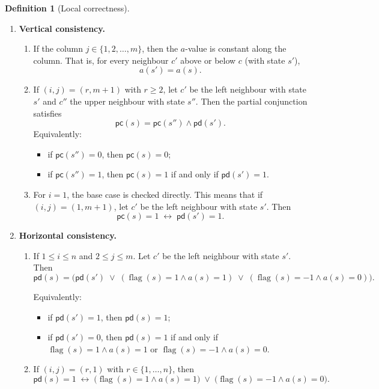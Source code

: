\documentclass{article}
\theoremstyle{plain}
\theoremstyle{definition}
\newtheorem{definition}[theorem]{Definition}
\DeclareMathOperator{\flag}{flag}
\newcommand{\pc}{\mathsf{pc}}
\newcommand{\pd}{\mathsf{pd}}
\begin{document}
\begin{definition}[Local correctness]
\begin{enumerate}[label=(\Alph*)]
\item \textbf{Vertical consistency.}
\begin{enumerate}[label=(C\arabic*)]
 \item If the column $j \in \{1,2,\dots,m\}$, then the $a$-value is constant along
the column. That is, for every neighbour $c'$ above or below $c$
(with state $s'$),
\[
a(s') = a(s).
\]
\item If $(i,j)=(r,m+1)$ with $r\ge 2$, let $c'$ be the left neighbour
with state $s'$ and $c''$ the upper neighbour with state $s''$.
Then the partial conjunction satisfies
\[
\pc(s)
=
\pc(s'') \wedge \pd(s').
\]
Equivalently:
\begin{itemize}
    \item if $\pc(s'')=0$, then $\pc(s)=0$;
    \item if $\pc(s'')=1$, then $\pc(s)=1$ if and only if $\pd(s')=1$.
\end{itemize}

  \item For $i=1$, the base case is checked directly. This means that if $(i,j)=(1,m+1)$, let $c'$ be the left neighbour with state
$s'$. Then
\[
\pc(s)=1 \;\leftrightarrow\; \pd(s')=1.
\]
\end{enumerate}
\item \textbf{Horizontal consistency.}
\begin{enumerate}[label=(D\arabic*)]
  \item If $1 \leq i \leq n$ and $2 \leq j \leq m$. Let $c'$ be the
left neighbour with state $s'$. Then
\[
\pd(s)
=
\bigl(\pd(s')
\;\vee\;
(\flag(s)=1 \wedge a(s)=1)
\;\vee\;
(\flag(s)=-1 \wedge a(s)=0)\bigr).
\]

Equivalently:
\begin{itemize}
    \item if $\pd(s')=1$, then $\pd(s)=1$;
    \item if $\pd(s')=0$, then $\pd(s)=1$ if and only if 
    $\flag(s)=1 \wedge a(s)=1$ or 
    $\flag(s)=-1 \wedge a(s)=0$.
\end{itemize}

  \item If $(i,j)=(r,1)$ with $r\in\{1,\dots,n\}$, then
\[
\pd(s)=1
\;\leftrightarrow\;
\bigl(\flag(s)=1 \wedge a(s)=1\bigr)
\;\vee\;
\bigl(\flag(s)=-1 \wedge a(s)=0\bigr).
\]
\end{enumerate}



\end{enumerate}
\end{definition}
\end{document}

